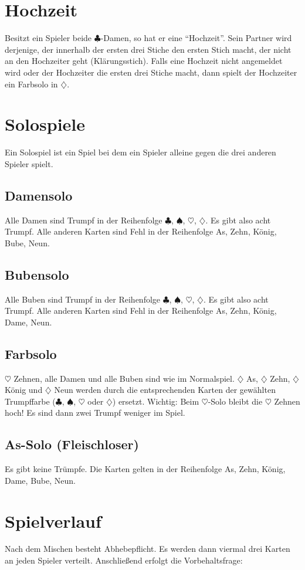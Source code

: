 \documentclass[12pt]{scrartcl}
\newcommand{\kreuz}{$\clubsuit$\xspace}
\newcommand{\pik}{$\spadesuit$\xspace}
\newcommand{\herz}{$\heartsuit$\xspace}
\newcommand{\karo}{$\diamondsuit$\xspace}
\begin{document}
\section{Hochzeit}
Besitzt ein Spieler beide \kreuz -Damen, so hat er eine "`Hochzeit"'. Sein Partner wird derjenige, der innerhalb der ersten drei Stiche den ersten Stich macht, der nicht an den Hochzeiter geht (Klärungsstich). Falls eine Hochzeit nicht angemeldet wird oder der Hochzeiter die ersten drei Stiche macht, dann spielt der Hochzeiter ein Farbsolo in \karo.

\section{Solospiele}
Ein Solospiel ist ein Spiel bei dem ein Spieler alleine gegen die drei anderen Spieler spielt.

\subsection{Damensolo}
Alle Damen sind Trumpf in der Reihenfolge \kreuz, \pik, \herz, \karo. Es gibt also acht Trumpf. Alle anderen Karten sind Fehl in der Reihenfolge As, Zehn, König, Bube, Neun.

\subsection{Bubensolo}
Alle Buben sind Trumpf in der Reihenfolge \kreuz, \pik, \herz, \karo. Es gibt also acht Trumpf. Alle anderen Karten sind Fehl in der Reihenfolge As, Zehn, König, Dame, Neun.

\subsection{Farbsolo}
\herz Zehnen, alle Damen und alle Buben sind wie im Normalspiel. \karo As, \karo Zehn, \karo König und \karo Neun werden durch die entsprechenden Karten der gewählten Trumpffarbe (\kreuz, \pik, \herz oder \karo) ersetzt. Wichtig: Beim \herz -Solo bleibt die \herz Zehnen hoch! Es sind dann zwei Trumpf weniger im Spiel.

\subsection{As-Solo (Fleischloser)}
Es gibt keine Trümpfe. Die Karten gelten in der Reihenfolge As, Zehn, König, Dame, Bube, Neun.

\section{Spielverlauf} Nach dem
Mischen besteht Abhebepflicht. Es werden dann viermal drei Karten an jeden Spieler verteilt. Anschließend erfolgt die Vorbehaltsfrage:
\end{document}
